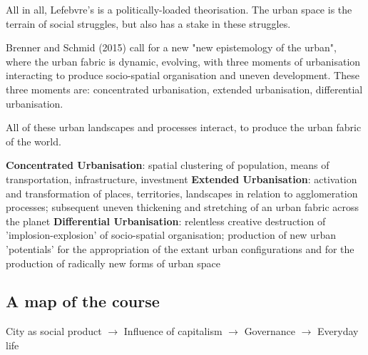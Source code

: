 \documentclass{article}
\begin{document}
All in all, Lefebvre's is a politically-loaded theorisation. The urban space is the terrain of social struggles, but also has a stake in these struggles.

Brenner and Schmid (2015) call for a new "new epistemology of the urban", where the urban fabric is dynamic, evolving, with three moments of urbanisation interacting to produce socio-spatial organisation and uneven development. These three moments are: concentrated urbanisation, extended urbanisation, differential urbanisation.

All of these urban landscapes and processes interact, to produce the urban fabric of the world.

\begin{outline}
	\1 \textbf{Concentrated Urbanisation}: spatial clustering of population, means of transportation, infrastructure, investment
	\1 \textbf{Extended Urbanisation}: activation and transformation of places, territories, landscapes in relation to agglomeration processes; subsequent uneven thickening and stretching of an urban fabric across the planet
	\1 \textbf{Differential Urbanisation}: relentless creative destruction of 'implosion-explosion' of socio-spatial organisation; production of new urban 'potentials' for the appropriation of the extant urban configurations and for the production of radically new forms of urban space
\end{outline}

\subsection{A map of the course}

City as social product $\rightarrow$ Influence of capitalism $\rightarrow$ Governance $\rightarrow$ Everyday life
\end{document}

